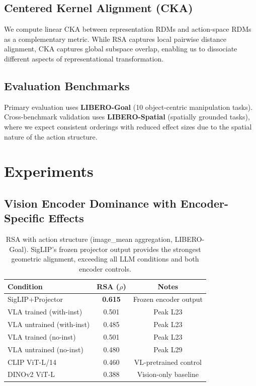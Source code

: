 \documentclass[letterpaper]{article}
\begin{document}
\subsection{Centered Kernel Alignment (CKA)}

We compute linear CKA between representation RDMs and action-space RDMs as a complementary metric.
While RSA captures local pairwise distance alignment, CKA captures global subspace overlap, enabling us to dissociate different aspects of representational transformation.

\subsection{Evaluation Benchmarks}

Primary evaluation uses \textbf{LIBERO-Goal} (10 object-centric manipulation tasks).
Cross-benchmark validation uses \textbf{LIBERO-Spatial} (spatially grounded tasks), where we expect consistent orderings with reduced effect sizes due to the spatial nature of the action structure.

\section{Experiments}

\subsection{Vision Encoder Dominance with Encoder-Specific Effects}
\label{sec:exp-encoder}

\begin{table}[t]
\centering
\caption{RSA with action structure (image\_mean aggregation, LIBERO-Goal). SigLIP's frozen projector output provides the strongest geometric alignment, exceeding all LLM conditions and both encoder controls.}
\label{tab:rsa-main}
\begin{tabular}{lcc}
\toprule
\textbf{Condition} & \textbf{RSA ($\rho$)} & \textbf{Notes} \\
\midrule
SigLIP+Projector              & \textbf{0.615} & Frozen encoder output \\
VLA trained (with-inst)       & 0.501 & Peak L23 \\
VLA untrained (with-inst)     & 0.485 & Peak L23 \\
VLA trained (no-inst)         & 0.501 & Peak L23 \\
VLA untrained (no-inst)       & 0.480 & Peak L29 \\
\midrule
CLIP ViT-L/14                 & 0.460 & VL-pretrained control \\
DINOv2 ViT-L                  & 0.388 & Vision-only baseline \\
\bottomrule
\end{tabular}
\end{table}
\end{document}
